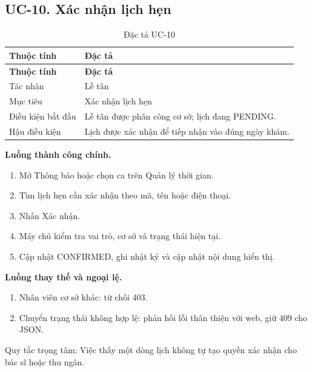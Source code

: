 \clearpage

\subsection{UC-10.\allowbreak{} Xác nhận lịch hẹn}
\label{uc:10}

{\small\setlength{\tabcolsep}{3pt}\renewcommand{\arraystretch}{1.12}
\begin{longtable}{@{}L{\textwidth-1.32pt\relax} L{\textwidth-4.68pt\relax}@{}}
\caption{Đặc tả UC-10}\\
\toprule
\textbf{Thuộc tính} & \textbf{Đặc tả}\\\midrule
\endfirsthead
\toprule
\textbf{Thuộc tính} & \textbf{Đặc tả}\\\midrule
\endhead
\bottomrule\endlastfoot
Tác nhân & Lễ tân\\[3pt]
Mục tiêu & Xác nhận lịch hẹn\\[3pt]
Điều kiện bắt đầu & Lễ tân được phân công cơ sở; lịch đang PENDING.\allowbreak{}\\[3pt]
Hậu điều kiện & Lịch được xác nhận để tiếp nhận vào đúng ngày khám.\allowbreak{}\\[3pt]
\end{longtable}}
\noindent\textbf{Luồng thành công chính.}
\begin{enumerate}
\item Mở Thông báo hoặc chọn ca trên Quản lý thời gian.\allowbreak{}
\item Tìm lịch hẹn cần xác nhận theo mã, tên hoặc điện thoại.\allowbreak{}
\item Nhấn Xác nhận.\allowbreak{}
\item Máy chủ kiểm tra vai trò, cơ sở và trạng thái hiện tại.\allowbreak{}
\item Cập nhật CONFIRMED, ghi nhật ký và cập nhật nội dung hiển thị.\allowbreak{}
\end{enumerate}
\noindent\textbf{Luồng thay thế và ngoại lệ.}
\begin{enumerate}
\item Nhân viên cơ sở khác:\allowbreak{} từ chối 403.\allowbreak{}
\item Chuyển trạng thái không hợp lệ:\allowbreak{} phản hồi lỗi thân thiện với web, giữ 409 cho JSON.\allowbreak{}
\end{enumerate}
Quy tắc trọng tâm:\allowbreak{} Việc thấy một dòng lịch không tự tạo quyền xác nhận cho bác sĩ hoặc thu ngân.\allowbreak{}

\clearpage

